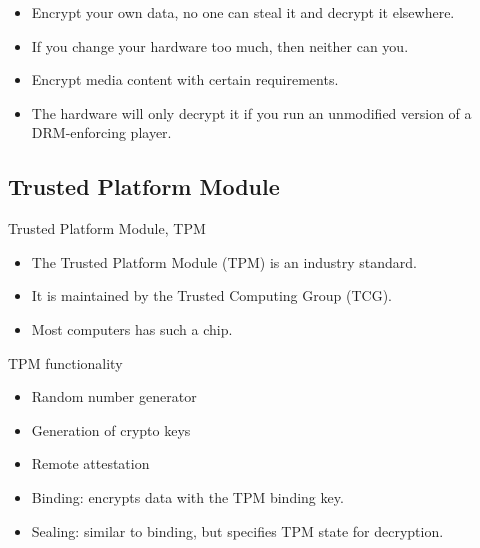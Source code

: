 \begin{frame}
  \begin{example}
    \begin{itemize}
      \item Encrypt your own data, no one can steal it and decrypt it 
        elsewhere.
      \item If you change your hardware too much, then neither can you.
    \end{itemize}
  \end{example}

  \pause{}

  \begin{example}
    \begin{itemize}
      \item Encrypt media content with certain requirements.
      \item The hardware will only decrypt it if you run an unmodified version 
        of a DRM-enforcing player.
    \end{itemize}
  \end{example}
\end{frame}

\subsection{Trusted Platform Module}

\begin{frame}
  \begin{block}{Trusted Platform Module, TPM}
    \begin{itemize}
      \item The Trusted Platform Module (TPM) is an industry standard.
      \item It is maintained by the Trusted Computing Group (TCG).
      \item Most computers has such a chip.
    \end{itemize}
  \end{block}
\end{frame}

\begin{frame}
  \begin{block}{TPM functionality}
    \begin{itemize}
      \item Random number generator
      \item Generation of crypto keys
      \item Remote attestation
      \item Binding: encrypts data with the TPM binding key.
      \item Sealing: similar to binding, but specifies TPM state for 
        decryption.
    \end{itemize}
  \end{block}
\end{frame}

